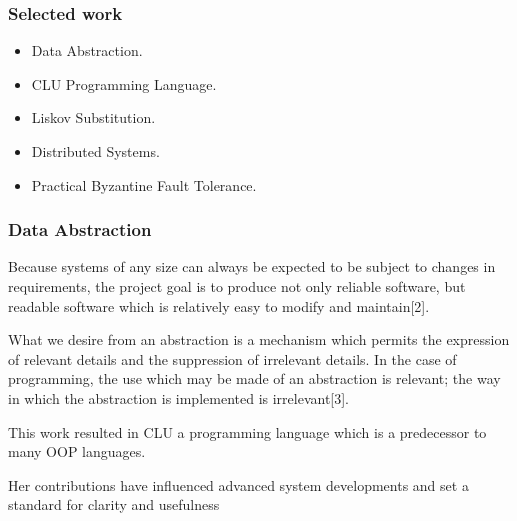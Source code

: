 \documentclass{beamer}
\begin{document}

\begin{frame}
\frametitle{Selected work}
\begin{itemize}
\item Data Abstraction.
\item CLU Programming Language.
\item Liskov Substitution.
\item Distributed Systems.
\item Practical Byzantine Fault Tolerance.
\end{itemize}
\end{frame}


\begin{frame}
\frametitle{Data Abstraction}
Because  systems  of  any  size  can  always  be  expected  to  be  subject  to  changes  in  requirements,  the  project  goal  is  to  produce  not  only  reliable  software,  but  readable  software  which  is relatively  easy  to  modify  and  maintain[2].

\vspace{5mm}

What we desire from an abstraction is a mechanism which permits the expression of relevant details and the suppression of irrelevant details. In the case of programming, the use which may be made of an abstraction is relevant; the way in which the abstraction is implemented is irrelevant[3]. 

\vspace{5mm}

This work resulted in CLU a programming language which is a predecessor to many OOP languages.

\vspace{5mm}

Her contributions have influenced advanced system developments and set a standard for clarity and usefulness

\end{frame}
\end{document}
